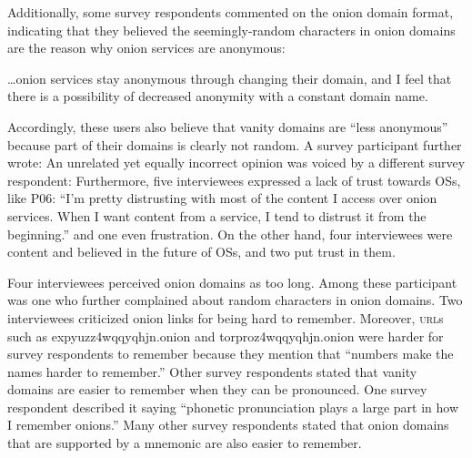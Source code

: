 
Additionally, some survey respondents commented on the onion domain format,
indicating that they believed the seemingly-random characters in onion domains
are the reason why onion services are anonymous:

\begin{displayquote}
\ldots onion services stay anonymous through changing their domain, and I
feel that there is a possibility of decreased anonymity with a constant domain
name.
\end{displayquote}

Accordingly, these users also believe that vanity domains are ``less anonymous''
because part of their domains is clearly not random.  A survey participant
further wrote:   An unrelated yet
equally incorrect opinion was voiced by a different survey respondent:
Furthermore, five interviewees expressed a lack of trust towards OSs, like P06:
``I'm pretty distrusting with most of the content I access over onion services.
When I want content from a service, I tend to distrust it from the beginning.''
and one even frustration. On the other hand, four interviewees were content and
believed in the future of OSs, and two put trust in them.

Four interviewees perceived onion domains as too long.  Among these participant
was one who further complained about random characters in onion domains.  Two
interviewees criticized onion links for being hard to remember.  Moreover,
\textsc{url}s such as expyuzz4wqqyqhjn.onion and torproz4wqqyqhjn.onion were
harder for survey respondents to remember because they mention that ``numbers
make the names harder to remember.''  Other survey respondents stated that
vanity domains are easier to remember when they can be pronounced.  One survey
respondent described it saying  ``phonetic pronunciation
plays a large part in how I remember onions.'' Many other survey 
respondents stated that onion domains that are supported by a mnemonic are also
easier to remember.

